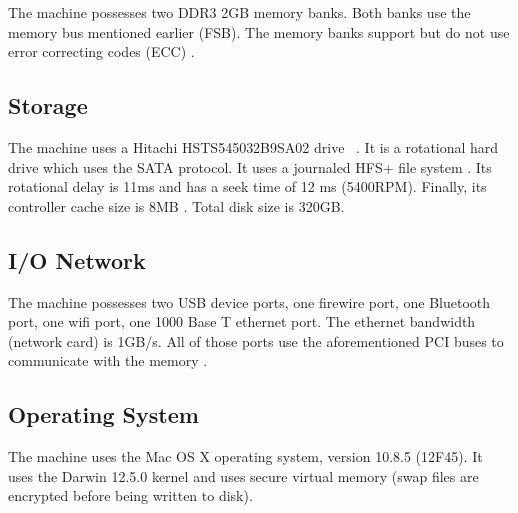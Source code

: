 The machine possesses two DDR3 2GB memory banks. Both banks use the memory bus mentioned earlier (FSB). The memory banks support but do not use error correcting codes (ECC) . 

\subsection{Storage}

The machine uses a Hitachi HSTS545032B9SA02 drive ~\cite{StarMicro}. It is a rotational hard drive which uses the SATA protocol. It uses a journaled HFS+ file system . Its rotational delay is 11ms and has a seek time of 12 ms (5400RPM). Finally, its controller cache size is 8MB . Total disk size is 320GB.

\subsection{I/O Network}
The machine possesses two USB device ports, one firewire port, one Bluetooth port, one wifi port, one 1000 Base T ethernet port. The ethernet bandwidth (network card) is 1GB/s. All of those ports use the aforementioned PCI buses to communicate with the memory .

\subsection{Operating System}
The machine uses the Mac OS X operating system, version 10.8.5 (12F45). It uses the Darwin 12.5.0 kernel and uses secure virtual memory (swap files are encrypted before being written to disk).
